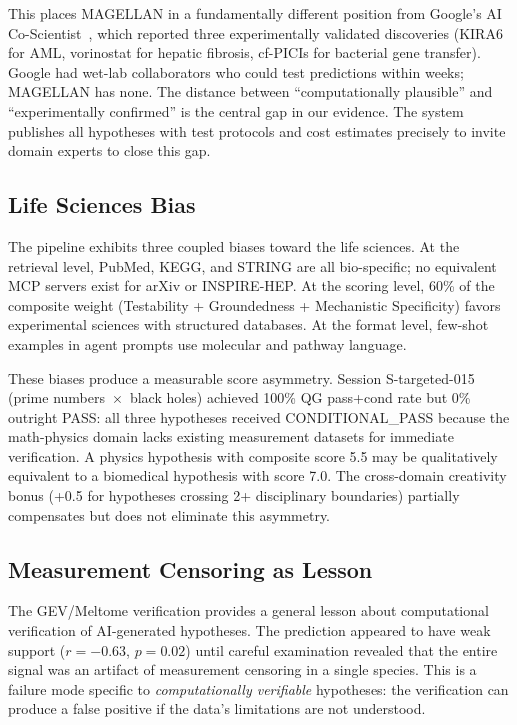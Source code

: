 This places MAGELLAN in a fundamentally different position from Google's AI Co-Scientist~\citep{gottweis2025}, which reported three experimentally validated discoveries (KIRA6 for AML, vorinostat for hepatic fibrosis, cf-PICIs for bacterial gene transfer). Google had wet-lab collaborators who could test predictions within weeks; MAGELLAN has none. The distance between ``computationally plausible'' and ``experimentally confirmed'' is the central gap in our evidence. The system publishes all hypotheses with test protocols and cost estimates precisely to invite domain experts to close this gap.

\subsection{Life Sciences Bias}

The pipeline exhibits three coupled biases toward the life sciences. At the retrieval level, PubMed, KEGG, and STRING are all bio-specific; no equivalent MCP servers exist for arXiv or INSPIRE-HEP. At the scoring level, 60\% of the composite weight (Testability + Groundedness + Mechanistic Specificity) favors experimental sciences with structured databases. At the format level, few-shot examples in agent prompts use molecular and pathway language.

These biases produce a measurable score asymmetry. Session S-targeted-015 (prime numbers~$\times$~black holes) achieved 100\% QG pass+cond rate but 0\% outright PASS: all three hypotheses received CONDITIONAL\_PASS because the math-physics domain lacks existing measurement datasets for immediate verification. A physics hypothesis with composite score 5.5 may be qualitatively equivalent to a biomedical hypothesis with score 7.0. The cross-domain creativity bonus (+0.5 for hypotheses crossing 2+ disciplinary boundaries) partially compensates but does not eliminate this asymmetry.

\subsection{Measurement Censoring as Lesson}

The GEV/Meltome verification provides a general lesson about computational verification of AI-generated hypotheses. The prediction appeared to have weak support ($r = -0.63$, $p = 0.02$) until careful examination revealed that the entire signal was an artifact of measurement censoring in a single species. This is a failure mode specific to \emph{computationally verifiable} hypotheses: the verification can produce a false positive if the data's limitations are not understood.

